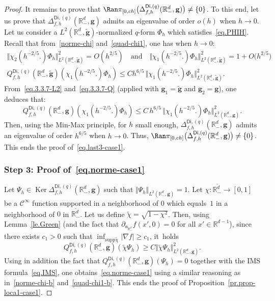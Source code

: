 \documentclass[10pt]{amsart}
\newcommand{\quand}{\quad\text{and}\quad}
\newcommand{\mbf}[1]{\mathbf{#1}}
\DeclareMathOperator\Ker{Ker}
\theoremstyle{plain}
\theoremstyle{definition}
\begin{document}
\begin{proof}
It remains to prove that $\Ran \pi_{[0,ch]}\bigl(\Delta_{f,h}^{\mathsf{Di},(q)}(\mathbb R_-^d, \mbf g) \bigr)\neq \{0\}$. To this end, let us prove that $
\Delta_{f,h}^{\mathsf{Di},(q)}(\mathbb R^d_-,\mbf g)$ admits an eigenvalue of order $o(h)$ when $h\to 0$.
Let us consider a $L^2(\mathbb R^d_-,\tilde{\mbf g})$-normalized $q$-form $\Phi_h$ which satisfies~\eqref{eq.PHIH}.
Recall that from~\eqref{norme-chi} and~\eqref{quad-chi1}, one has when $h\to 0$:
\begin{gather*}
\big\Vert \chi_2(h^{-2/5 }.) \Phi_h\big \Vert_{L^2(\mathbb R_-^d,\tilde{\mbf g})}^2 =O(h^{2/5 }) \quand \big\Vert \chi_1(h^{-2/5 }.) \Phi_h\big\Vert_{L^2(\mathbb R_-^d,\tilde{\mbf g})}^2=1+O\bigl(h^{2/5 }\bigr)
\\
\tag*{and}
Q_{f,h}^{\mathsf{Di},(q)}(\mathbb R^d_-,\tilde{\mbf g})(\chi_1(h^{-2/5 }.)\Phi_h)\le C h^{ 6/5} \, \big \Vert \chi_1(h^{-2/5 }.)\Phi_h\big \Vert_{L^2(\mathbb R^d_-,\tilde{\mbf g})}^2.
\end{gather*}
From~\eqref{eq.3.3.7-L2} and~\eqref{eq.3.3.7-Q} (applied with $\mbf g_1=\tilde{\mbf g}$ and $\mbf g_2=\mbf g$), one deduces that:
\begin{equation}\label{bes2}
Q_{f,h}^{\mathsf{Di},(q)}(\mathbb R^d_-,\mbf g)(\chi_1(h^{-2/5 }.)\Phi_h)\le C\, h^{6/5}\, \big \Vert \chi_1(h^{-2/5 }.)\Phi_h\big \Vert_{L^2(\mathbb R^d_-,\mbf g)}^2.
\end{equation}
Then, using the Min-Max principle, for $h$ small enough, $
\Delta_{f,h}^{\mathsf{Di},(q)}(\mathbb R^d_-,\mbf g)$ admits an eigenvalue of order $ h^{ 6/5}$ when $h\to 0$. Thus, $\Ran \pi_{[0,ch]}\bigl(\Delta_{f,h}^{\mathsf{Di},(q)}(\mathbb R_-^d, \mbf g) \bigr)\neq \{0\}$.
This ends the proof of~\eqref{eq.last3-case1}.

\subsubsection*{Step 3: Proof of~\eqref{eq.norme-case1}}
Let $\Psi_h\in \Ker \Delta_{f,h}^{\mathsf{Di},(q)}(\mathbb R^d_-,\mbf g)$ such that $ \Vert \Psi_h \Vert_{L^2(\mathbb R^d_-,\mbf g)}=1$. Let $\chi: \overline{\mathbb R^{d}_-}\to [0,1]$ be a $\mathcal C^\infty$ function supported in a neighborhood of $0$ which equals~$1$ in a neighborhood of $0$ in $\overline{\mathbb R^{d}_-}$. Let us define $\tilde \chi=\sqrt{1-\chi^2}$. Then, using Lemma~\ref{le.Green} (and the fact that $\partial_{\mathsf n_{\mathbb R^d_-}}f(x',0)=0$ for all $x'\in \mathbb R^{d-1}$), since there exists $c_1>0$ such that $\inf_{\text{supp}\tilde \chi}\vert \nabla f\vert \ge c_1 $, it~holds
\[
Q_{f,h}^{\mathsf{Di},(q)}(\mathbb R^d_-,\mbf g)(\tilde \chi \Psi_h)\ge C \big \Vert \tilde \chi \Psi_h\big \Vert_{L^2(\mathbb R^d_-,\mbf g)}^2.
\]
Using in addition the fact that $Q_{f,h}^{\mathsf{Di},(q)}(\mathbb R^d_-,\mbf g)(\Psi_h)=0$ together with the IMS formula~\eqref{eq.IMS}, one obtains~\eqref{eq.norme-case1} using a similar reasoning as in~\eqref{norme-chi-b} and~\eqref{quad-chi1-b}. This ends the proof of Proposition~\ref{pr.prop-loca1-case1}.
\end{proof}
\end{document}
